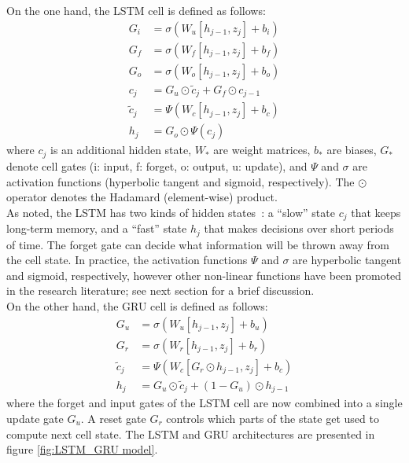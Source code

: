 \documentclass[11pt,oneside,a4paper,openright]{book}
\begin{document}
On the one hand, the LSTM cell is defined as follows:
%
\begin{align}\label{eq:lstm}
        G_i &= \sigma(W_u [ h_{j-1}, z_j ] + b_i) \\
        G_f &= \sigma(W_f [ h_{j-1}, z_j ] + b_f) \\
        G_o &= \sigma(W_o [ h_{j-1}, z_j ] + b_o) \\
        c_j &= G_u \odot \tilde{c}_j + G_f \odot c_{j-1} \\
\tilde{c}_j &= \Psi(W_c [ h_{j-1}, z_j ] + b_c) \\
        h_j &= G_o \odot \Psi(c_j)
\end{align}
%
where
    $c_j$ is an additional hidden state, %
$W_*$ are weight matrices,
$b_*$ are biases,
$G_*$ denote cell gates (i: input, f: forget, o: output, u: update),
and $\Psi$ and $\sigma$ are activation functions (hyperbolic tangent and sigmoid, respectively).
The $\odot$ operator denotes the Hadamard (element-wise) product.\\

As noted, the LSTM has two kinds of hidden states~\cite{Jozefowicz15}:
a ``slow'' state $c_j$ that keeps long-term memory, %
and a ``fast'' state $h_j$ that makes decisions over short periods of time.
The forget gate can decide what information will be thrown away from the cell state.
In practice, the activation functions $\Psi$ and $\sigma$ are hyperbolic tangent and sigmoid, respectively,
however other non-linear functions have been promoted in the research literature;
see next section for a brief discussion.\\

On the other hand, the GRU cell is defined as follows:
%
\begin{align}\label{eq:gru}
        G_u &= \sigma(W_u [ h_{j-1}, z_j ] + b_u) \\
        G_r &= \sigma(W_r [ h_{j-1}, z_j ] + b_r) \\
\tilde{c}_j &= \Psi(W_c [G_r \odot h_{j-1}, z_j ] + b_c) \\
        h_j &= G_u \odot \tilde{c}_j + (1 - G_u) \odot h_{j-1}
\end{align}
%
where the forget and input gates of the LSTM cell are now combined into a single update gate $G_u$.
A reset gate $G_r$ controls which parts of the state get used to compute next cell state. The LSTM and GRU architectures are presented in figure \autoref{fig:LSTM_GRU model}.\\
\end{document}
